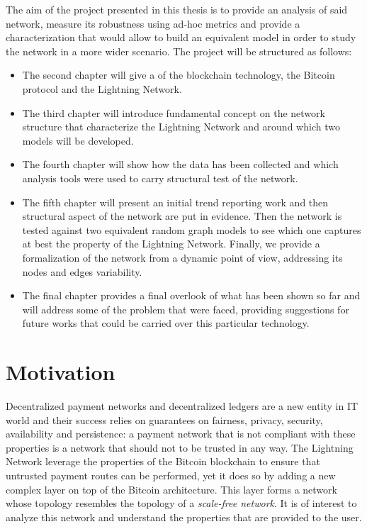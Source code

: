 		The aim of the project presented in this thesis is to provide an analysis of said network, measure its robustness using ad-hoc metrics and provide a characterization that would allow to build an equivalent model in order to study the network in a more wider scenario. The project will be structured as follows:
		\begin{itemize}
			\item The second chapter will give a  of the blockchain technology, the Bitcoin protocol and the Lightning Network.
			\item The third chapter will introduce fundamental concept on the network structure that characterize the Lightning Network and around which two models will be developed.
			\item The fourth chapter will show how the data has been collected and which analysis tools were used to carry structural test of the network.
			\item The fifth chapter will present an initial trend reporting work and then structural aspect of the network are put in evidence. Then the network is tested against two equivalent random graph models to see which one captures at best the property of the Lightning Network. Finally, we provide a formalization of the network from a dynamic point of view, addressing its nodes and edges variability.
			\item The final chapter provides a final overlook of what has been shown so far and will address some of the problem that were faced, providing suggestions for future works that could be carried over this particular technology.
		\end{itemize}
	\section{Motivation}
		Decentralized payment networks and decentralized ledgers are a new entity in IT world and their success relies on guarantees on fairness, privacy, security, availability and persistence: a payment network that is not compliant with these properties is a network that should not to be trusted in any way. The Lightning Network leverage the properties of the Bitcoin blockchain to ensure that untrusted payment routes can be performed, yet it does so by adding a new complex layer on top of the Bitcoin architecture. This layer forms a network whose topology resembles the topology of a \textit{scale-free network}. It is of interest to analyze this network and understand the properties that are provided to the user. 
		
